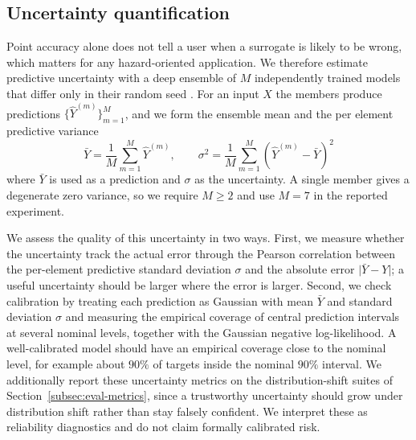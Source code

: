\subsection{Uncertainty quantification}
\label{subsec:uncertainty}
Point accuracy alone does not tell a user when a surrogate is likely to be wrong, which matters for any hazard-oriented application. We therefore estimate predictive uncertainty with a deep ensemble of $M$ independently trained models that differ only in their random seed \citep{lakshminarayanan2017deepensembles}. For an input $X$ the members produce predictions $\{\widehat{Y} ^ {(m)}\}_{m = 1} ^ {M}$, and we form the ensemble mean and the per element predictive variance
\[
\bar{Y} = \frac{1}{M}\sum_{m = 1} ^ {M}\widehat{Y} ^ {(m)},
\qquad
\sigma ^ 2 = \frac{1}{M}\sum_{m = 1} ^ {M}\left(\widehat{Y} ^ {(m)} - \bar{Y}\right) ^ 2
\]
where $\bar{Y}$ is used as a prediction and $\sigma$ as the uncertainty. A single member gives a degenerate zero variance, so we require $M \ge 2$ and use $M = 7$ in the reported experiment.

We assess the quality of this uncertainty in two ways. First, we measure whether the uncertainty track the actual error through the Pearson correlation between the per-element predictive standard deviation $\sigma$ and the absolute error $\lvert \bar{Y} - Y \rvert$; a useful uncertainty should be larger where the error is larger. Second, we check calibration by treating each prediction as Gaussian with mean $\bar{Y}$ and standard deviation $\sigma$ and measuring the empirical coverage of central prediction intervals at several nominal levels, together with the Gaussian negative log-likelihood. A well-calibrated model should have an empirical coverage close to the nominal level, for example about $90\%$ of targets inside the nominal $90\%$ interval. We additionally report these uncertainty metrics on the distribution-shift suites of Section~\ref{subsec:eval-metrics}, since a trustworthy uncertainty should grow under distribution shift rather than stay falsely confident. We interpret these as reliability diagnostics and do not claim formally calibrated risk.
